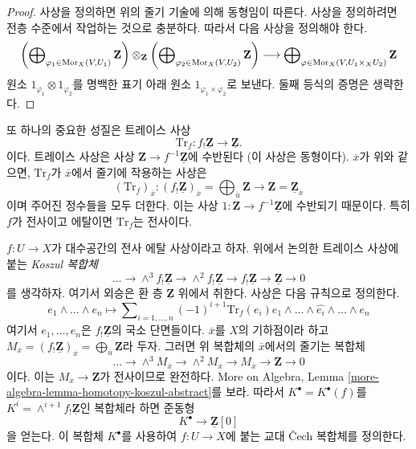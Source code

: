 \begin{proof}
사상을 정의하면 위의 줄기 기술에 의해 동형임이 따른다.
사상을 정의하려면 전층 수준에서 작업하는 것으로 충분하다.
따라서 다음 사상을 정의해야 한다.
$$
\left(\bigoplus\nolimits_{\varphi_1 \in \mathop{\mathrm{Mor}}\nolimits_X(V, U_1)} \mathbf{Z}\right)
\otimes_{\mathbf{Z}}
\left(\bigoplus\nolimits_{\varphi_2 \in \mathop{\mathrm{Mor}}\nolimits_X(V, U_2)} \mathbf{Z}\right)
\longrightarrow
\bigoplus\nolimits_{\varphi \in \mathop{\mathrm{Mor}}\nolimits_X(V, U_1 \times_X U_2)}
\mathbf{Z}
$$
원소 $1_{\varphi_1} \otimes 1_{\varphi_2}$를 명백한 표기 아래 원소
$1_{\varphi_1 \times \varphi_2}$로 보낸다. 둘째 등식의 증명은 생략한다.
\end{proof}

\noindent
또 하나의 중요한 성질은 트레이스 사상
$$
\text{Tr}_f : f_!\underline{\mathbf{Z}} \longrightarrow \underline{\mathbf{Z}}.
$$
이다. 트레이스 사상은 사상
$\mathbf{Z} \to f^{-1}\underline{\mathbf{Z}}$에 수반된다
(이 사상은 동형이다). $\overline{x}$가 위와 같으면,
$\text{Tr}_f$가 $\overline{x}$에서 줄기에 작용하는 사상은
$$
(\text{Tr}_f)_{\overline{x}} :
(f_!\underline{\mathbf{Z}})_{\overline{x}} =
\bigoplus\nolimits_{\overline{u}} \mathbf{Z}
\longrightarrow
\mathbf{Z} = \underline{\mathbf{Z}}_{\overline{x}}
$$
이며 주어진 정수들을 모두 더한다. 이는 사상
$1 : \mathbf{Z} \to f^{-1}\underline{\mathbf{Z}}$에 수반되기 때문이다.
특히 $f$가 전사이고 에탈이면 $\text{Tr}_f$는 전사이다.

\medskip\noindent
$f : U \to X$가 대수공간의 전사 에탈 사상이라고 하자.
위에서 논의한 트레이스 사상에 붙는 {\it Koszul 복합체}
$$
\ldots \to \wedge^3f_!\underline{\mathbf{Z}} \to
\wedge^2f_!\underline{\mathbf{Z}} \to f_!\underline{\mathbf{Z}} \to
\underline{\mathbf{Z}} \to 0
$$
를 생각하자. 여기서 외승은 환 층 $\underline{\mathbf{Z}}$ 위에서
취한다. 사상은 다음 규칙으로 정의한다.
$$
e_1 \wedge \ldots \wedge e_n \longmapsto
\sum\nolimits_{i = 1, \ldots, n} (-1)^{i + 1}
\text{Tr}_f(e_i)
e_1 \wedge \ldots \wedge \widehat{e_i} \wedge \ldots \wedge e_n
$$
여기서 $e_1, \ldots, e_n$은 $f_!\underline{\mathbf{Z}}$의 국소
단면들이다. $\overline{x}$를 $X$의 기하점이라 하고
$M_{\overline{x}} = (f_!\underline{\mathbf{Z}})_{\overline{x}} =
\bigoplus_{\overline{u}} \mathbf{Z}$라 두자. 그러면 위 복합체의
$\overline{x}$에서의 줄기는 복합체
$$
\ldots \to \wedge^3 M_{\overline{x}} \to \wedge^2 M_{\overline{x}}
\to M_{\overline{x}} \to \mathbf{Z} \to 0
$$
이다. 이는 $M_{\overline{x}} \to \mathbf{Z}$가 전사이므로 완전하다.
More on Algebra, Lemma
\ref{more-algebra-lemma-homotopy-koszul-abstract}를 보라. 따라서
$K^\bullet = K^\bullet(f)$를 $K^i = \wedge^{i + 1}f_!\underline{\mathbf{Z}}$인
복합체라 하면 준동형
\begin{equation}
\label{equation-quasi-isomorphism}
K^\bullet \longrightarrow \underline{\mathbf{Z}}[0]
\end{equation}
을 얻는다. 이 복합체 $K^\bullet$를 사용하여 $f : U \to X$에 붙는
교대 {\v C}ech 복합체를 정의한다.


